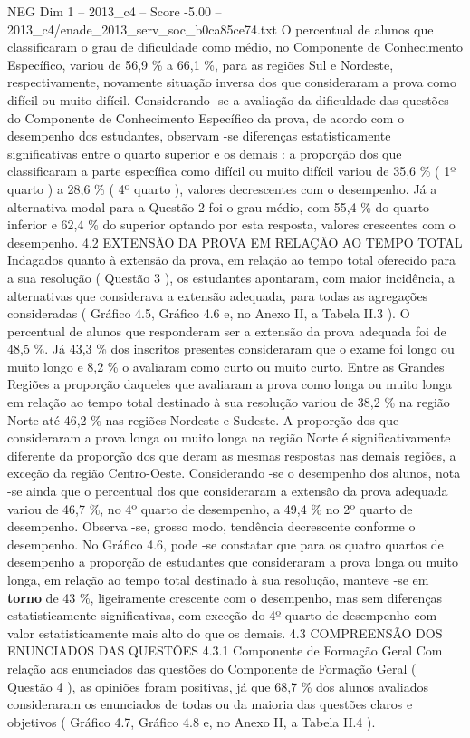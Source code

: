 \begin{textsample}{NEG Dim 1 – 2013\_c4 – Score -5.00 – 2013\_c4/enade\_2013\_serv\_soc\_b0ca85ce74.txt}
O percentual de alunos que classificaram o grau de dificuldade como médio, no Componente de Conhecimento Específico, variou de 56,9 \% a 66,1 \%, para as regiões Sul e Nordeste, respectivamente, novamente situação inversa dos que consideraram a prova como difícil ou muito difícil.
Considerando -se a avaliação da dificuldade das questões do Componente de Conhecimento Específico da prova, de acordo com o desempenho dos estudantes, observam -se diferenças estatisticamente significativas entre o quarto superior e os demais : a proporção dos que classificaram a parte específica como difícil ou muito difícil variou de 35,6 \% ( 1º quarto ) a 28,6 \% ( 4º quarto ), valores decrescentes com o desempenho.
Já a alternativa modal para a Questão 2 foi o grau médio, com 55,4 \% do quarto inferior e 62,4 \% do superior optando por esta resposta, valores crescentes com o desempenho. 4.2 EXTENSÃO DA PROVA EM RELAÇÃO AO TEMPO TOTAL Indagados quanto à extensão da prova, em relação ao tempo total oferecido para a sua resolução ( Questão 3 ), os estudantes apontaram, com maior incidência, a alternativas que considerava a extensão adequada, para todas as agregações consideradas ( Gráfico 4.5, Gráfico 4.6 e, no Anexo II, a Tabela II.3 ).
O percentual de alunos que responderam ser a extensão da prova adequada foi de 48,5 \%.
Já 43,3 \% dos inscritos presentes consideraram que o exame foi longo ou muito longo e 8,2 \% o avaliaram como curto ou muito curto.
Entre as Grandes Regiões a proporção daqueles que avaliaram a prova como longa ou muito longa em relação ao tempo total destinado à sua resolução variou de 38,2 \% na região Norte até 46,2 \% nas regiões Nordeste e Sudeste.
A proporção dos que consideraram a prova longa ou muito longa na região Norte é significativamente diferente da proporção dos que deram as mesmas respostas nas demais regiões, a exceção da região Centro-Oeste.
Considerando -se o desempenho dos alunos, nota -se ainda que o percentual dos que consideraram a extensão da prova adequada variou de 46,7 \%, no 4º quarto de desempenho, a 49,4 \% no 2º quarto de desempenho.
Observa -se, grosso modo, tendência decrescente conforme o desempenho.
No Gráfico 4.6, pode -se constatar que para os quatro quartos de desempenho a proporção de estudantes que consideraram a prova longa ou muito longa, em relação ao tempo total destinado à sua resolução, manteve -se em \textbf{torno} de 43 \%, ligeiramente crescente com o desempenho, mas sem diferenças estatisticamente significativas, com exceção do 4º quarto de desempenho com valor estatisticamente mais alto do que os demais. 4.3 COMPREENSÃO DOS ENUNCIADOS DAS QUESTÕES 4.3.1 Componente de Formação Geral Com relação aos enunciados das questões do Componente de Formação Geral ( Questão 4 ), as opiniões foram positivas, já que 68,7 \% dos alunos avaliados consideraram os enunciados de todas ou da maioria das questões claros e objetivos ( Gráfico 4.7, Gráfico 4.8 e, no Anexo II, a Tabela II.4 ).

\end{textsample}
